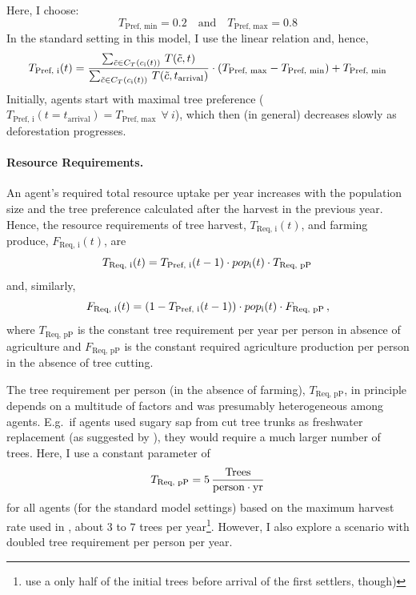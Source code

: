 Here, I choose: 
\begin{equation}
T_\text{Pref, min} = 0.2 \quad \text{and} \quad T_\text{Pref, max} = 0.8
\end{equation} 
In the standard setting in this model, I use the linear relation and, hence, 
\begin{equation}
	T_\text{Pref, i}(t) =  \frac{\sum_{\tilde{c} \in C_{T}(c_{\rm i}(t)) } \, T(\tilde{c}, t)}{\sum_{\tilde{c} \in C_{T}(c_{\rm i}(t))} \, T(\tilde{c}, t_\text{arrival}) } \cdot (T_\text{Pref, max}-T_\text{Pref, min}) + T_\text{Pref, min}
\end{equation}
Initially, agents start with maximal tree preference ($T_\text{Pref, i}(t=t_\text{arrival}) = T_\text{Pref, max} \ \  \forall \ i$), which then (in general) decreases slowly as deforestation progresses.

\paragraph{Resource Requirements.}
An agent's required total resource uptake per year increases with the population size and the tree preference calculated after the harvest in the previous year.
Hence, the resource requirements of tree harvest, $T_\text{Req, i}(t)$, and farming produce, $F_\text{Req, i}(t)$, are 
\begin{equation}
T_\text{Req, i}(t) = T_\text{Pref, i}(t-1) \cdot pop_{\rm i}(t) \cdot T_\text{Req, pP} \, 
\end{equation}
and, similarly, 
\begin{equation}
F_\text{Req, i}(t) = (1-T_\text{Pref, i}(t-1)) \cdot pop_{\rm i}(t) \cdot F_\text{Req, pP}\, , 
\end{equation}
where $T_\text{Req, pP}$ is the constant tree requirement per year per person in absence of agriculture and $F_\text{Req, pP}$ is the constant required agriculture production per person in the absence of tree cutting.

The tree requirement per person (in the absence of farming), $T_\text{Req, pP}$, in principle depends on a multitude of factors and was presumably heterogeneous among agents.
E.g.\ if agents used sugary sap from cut tree trunks as freshwater replacement (as suggested by ), they would require a much larger number of trees.
Here, I use a constant parameter of 
\begin{equation}
T_\text{Req, pP} = 5\, \frac{\text{Trees}}{\rm person\cdot yr}
\end{equation}
for all agents (for the standard model settings) based on the maximum harvest rate used in \citet{Brandt2015}, about $3$ to $7$ trees per year\footnote{\citet{Brandt2015} use a only half of the initial trees before arrival of the first settlers, though)}. 
However, I also explore a scenario with doubled tree requirement per person per year.

